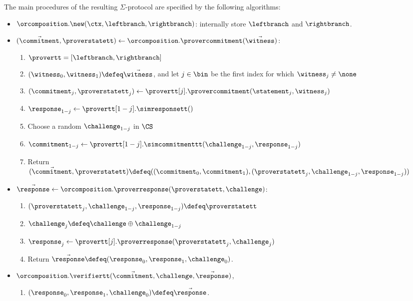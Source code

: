 \documentclass[11pt]{article}
\begin{document}
The main procedures of the resulting $\Sigma$-protocol are specified by the following algorithms:
\begin{itemize}
  \item
  $\orcomposition.\new(\ctx, \leftbranch, \rightbranch)$: internally store $\leftbranch$ and $\rightbranch$.
  \item
  $(\vec \commitment, \proverstatett)\gets \orcomposition.\provercommitment(\vec \witness)$:
    \begin{enumerate}
      \item $\provertt = [\leftbranch, \rightbranch]$
      \item
        $(\witness_0,\witness_1)\defeq \vec \witness$, and let $j \in \bin$ be the first index for which $\witness_{j}\neq\none$
      \item
        $(\commitment_j,\proverstatett_j)\gets\provertt[j].\provercommitment(\statement_j,\witness_j)$
      \item
			   $\response_{1-j}\gets\provertt[1-j].\simresponsett()$
			\item
        Choose a random $\challenge_{1-j}$ in $\CS$
      \item
        $\commitment_{1-j}\gets\provertt[1-j].\simcommitmenttt(\challenge_{1-j},\response_{1-j})$
      \item
	Return $(\vec \commitment,\proverstatett) \defeq ((\commitment_0,\commitment_1),(\proverstatett_j,\challenge_{1-j},\response_{1-j}))$
    \end{enumerate}
  \item
  $\vec \response \gets \orcomposition.\proverresponse(\proverstatett, \challenge)$:
    \begin{enumerate}
      \item  $(\proverstatett_j,\challenge_{1-j},\response_{1-j})\defeq\proverstatett$
      \item
         $\challenge_j\defeq \challenge\oplus \challenge_{1-j}$
         \item $\response_j\gets\provertt[j].\proverresponse(\proverstatett_j, \challenge_j)$
      \item
        Return $\vec \response\defeq(\response_0,\response_1, \challenge_0)$.
    \end{enumerate}
  \item
  $\orcomposition.\verifiertt(\vec \commitment, \challenge, \vec \response)$,
    \begin{enumerate}
      \item
         $(\response_0, \response_1, \challenge_0)\defeq \vec \response$.

\end{enumerate}
\end{itemize}
\end{document}
